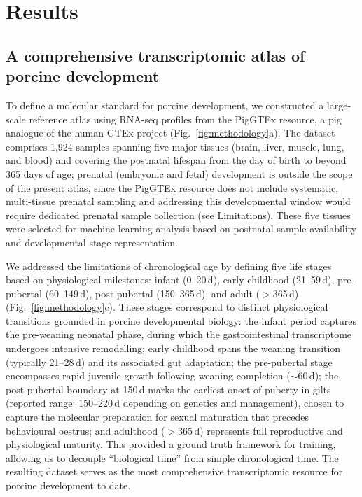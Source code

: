 \documentclass[10pt,a4paper]{article}
\newcommand{\figref}[1]{Fig.~\ref{#1}}
\begin{document}
\section{Results}

\subsection{A comprehensive transcriptomic atlas of porcine development}

To define a molecular standard for porcine development, we constructed a large-scale reference atlas using RNA-seq profiles from the PigGTEx resource\cite{teng_compendium_2024,chen_construction_2025,long_comprehensive_2024}, a pig analogue of the human GTEx project\cite{the_gtex_consortium_gtex_2020} (\figref{fig:methodology}a). The dataset comprises 1,924 samples spanning five major tissues (brain, liver, muscle, lung, and blood) and covering the postnatal lifespan from the day of birth to beyond 365 days of age; prenatal (embryonic and fetal) development is outside the scope of the present atlas, since the PigGTEx resource does not include systematic, multi-tissue prenatal sampling and addressing this developmental window would require dedicated prenatal sample collection (see Limitations). These five tissues were selected for machine learning analysis based on postnatal sample availability and developmental stage representation.

We addressed the limitations of chronological age by defining five life stages based on physiological milestones: infant (0--20\,d), early childhood (21--59\,d), pre-pubertal (60--149\,d), post-pubertal (150--365\,d), and adult ($>$365\,d) (\figref{fig:methodology}c). These stages correspond to distinct physiological transitions grounded in porcine developmental biology\cite{swindle_swine_2012}: the infant period captures the pre-weaning neonatal phase, during which the gastrointestinal transcriptome undergoes intensive remodelling\cite{inoue_weaning_2015}; early childhood spans the weaning transition (typically 21--28\,d) and its associated gut adaptation\cite{pluske_gastrointestinal_2018}; the pre-pubertal stage encompasses rapid juvenile growth following weaning completion ($\sim$60\,d)\cite{whittemore_whittemores_2006}; the post-pubertal boundary at 150\,d marks the earliest onset of puberty in gilts (reported range: 150--220\,d depending on genetics and management\cite{lents_physiological_2020,swindle_swine_2012}), chosen to capture the molecular preparation for sexual maturation that precedes behavioural oestrus\cite{lents_physiological_2020}; and adulthood ($>$365\,d) represents full reproductive and physiological maturity. This provided a ground truth framework for training, allowing us to decouple ``biological time'' from simple chronological time. The resulting dataset serves as the most comprehensive transcriptomic resource for porcine development to date.
\end{document}
